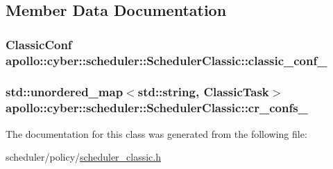 \subsection{Member Data Documentation}
\hypertarget{classapollo_1_1cyber_1_1scheduler_1_1SchedulerClassic_a03f2b19c90967ebc0d348d3e52912481}{
\subsubsection[{classic\-\_\-conf\-\_\-}]{\setlength{\rightskip}{0pt plus 5cm}Classic\-Conf apollo\-::cyber\-::scheduler\-::\-Scheduler\-Classic\-::classic\-\_\-conf\-\_\-\hspace{0.3cm}{\ttfamily [private]}}}\label{classapollo_1_1cyber_1_1scheduler_1_1SchedulerClassic_a03f2b19c90967ebc0d348d3e52912481}
\hypertarget{classapollo_1_1cyber_1_1scheduler_1_1SchedulerClassic_ae7586c7e1b5c30cb2d8b28833bc5a3e7}{
\subsubsection[{cr\-\_\-confs\-\_\-}]{\setlength{\rightskip}{0pt plus 5cm}std\-::unordered\-\_\-map$<$std\-::string, Classic\-Task$>$ apollo\-::cyber\-::scheduler\-::\-Scheduler\-Classic\-::cr\-\_\-confs\-\_\-\hspace{0.3cm}{\ttfamily [private]}}}\label{classapollo_1_1cyber_1_1scheduler_1_1SchedulerClassic_ae7586c7e1b5c30cb2d8b28833bc5a3e7}


The documentation for this class was generated from the following file\-:\begin{DoxyCompactItemize}
\item 
scheduler/policy/\hyperlink{scheduler__classic_8h}{scheduler\-\_\-classic.\-h}\end{DoxyCompactItemize}
